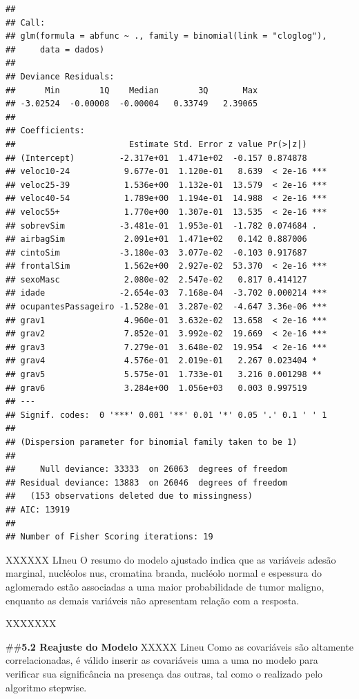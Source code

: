 \documentclass[]{article}
\begin{document}
\begin{verbatim}
## 
## Call:
## glm(formula = abfunc ~ ., family = binomial(link = "cloglog"), 
##     data = dados)
## 
## Deviance Residuals: 
##      Min        1Q    Median        3Q       Max  
## -3.02524  -0.00008  -0.00004   0.33749   2.39065  
## 
## Coefficients:
##                       Estimate Std. Error z value Pr(>|z|)    
## (Intercept)         -2.317e+01  1.471e+02  -0.157 0.874878    
## veloc10-24           9.677e-01  1.120e-01   8.639  < 2e-16 ***
## veloc25-39           1.536e+00  1.132e-01  13.579  < 2e-16 ***
## veloc40-54           1.789e+00  1.194e-01  14.988  < 2e-16 ***
## veloc55+             1.770e+00  1.307e-01  13.535  < 2e-16 ***
## sobrevSim           -3.481e-01  1.953e-01  -1.782 0.074684 .  
## airbagSim            2.091e+01  1.471e+02   0.142 0.887006    
## cintoSim            -3.180e-03  3.077e-02  -0.103 0.917687    
## frontalSim           1.562e+00  2.927e-02  53.370  < 2e-16 ***
## sexoMasc             2.080e-02  2.547e-02   0.817 0.414127    
## idade               -2.654e-03  7.168e-04  -3.702 0.000214 ***
## ocupantesPassageiro -1.528e-01  3.287e-02  -4.647 3.36e-06 ***
## grav1                4.960e-01  3.632e-02  13.658  < 2e-16 ***
## grav2                7.852e-01  3.992e-02  19.669  < 2e-16 ***
## grav3                7.279e-01  3.648e-02  19.954  < 2e-16 ***
## grav4                4.576e-01  2.019e-01   2.267 0.023404 *  
## grav5                5.575e-01  1.733e-01   3.216 0.001298 ** 
## grav6                3.284e+00  1.056e+03   0.003 0.997519    
## ---
## Signif. codes:  0 '***' 0.001 '**' 0.01 '*' 0.05 '.' 0.1 ' ' 1
## 
## (Dispersion parameter for binomial family taken to be 1)
## 
##     Null deviance: 33333  on 26063  degrees of freedom
## Residual deviance: 13883  on 26046  degrees of freedom
##   (153 observations deleted due to missingness)
## AIC: 13919
## 
## Number of Fisher Scoring iterations: 19
\end{verbatim}

XXXXXX LIneu O resumo do modelo ajustado indica que as variáveis adesão
marginal, nucléolos nus, cromatina branda, nucléolo normal e espessura
do aglomerado estão associadas a uma maior probabilidade de tumor
maligno, enquanto as demais variáveis não apresentam relação com a
resposta.

XXXXXXX

\#\#\textbf{5.2 Reajuste do Modelo} XXXXX Lineu Como as covariáveis são
altamente correlacionadas, é válido inserir as covariáveis uma a uma no
modelo para verificar sua significância na presença das outras, tal como
o realizado pelo algoritmo stepwise.
\end{document}
